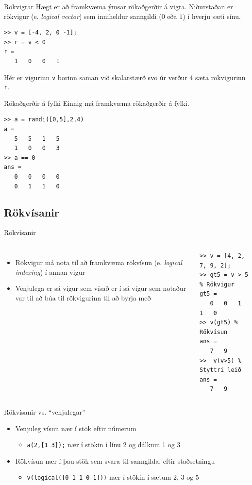 \documentclass{beamer}
\begin{document}
\begin{frame}[fragile]{Rökvigrar}
\vspace{\baselineskip}
Hægt er að framkvæma ýmsar rökaðgerðir á vigra. Niðurstaðan er rökvigur (e. \emph{logical vector}) sem inniheldur sanngildi ($0$ eða $1$) í hverju sæti sínu.
\begin{verbatim}
>> v = [-4, 2, 0 -1];
>> r = v < 0
r =
   1   0   0   1
\end{verbatim}
Hér er vigurinn \texttt{v} borinn saman við skalarstærð svo úr verður 4 sæta rökvigurinn \texttt{r}.
\end{frame}

\begin{frame}[fragile]{Rökaðgerðir á fylki}
\vspace{\baselineskip}
Einnig má framkvæma rökaðgerðir á fylki.
\begin{verbatim}
>> a = randi([0,5],2,4)
a =
   5   5   1   5
   1   0   0   3
>> a == 0
ans =
   0   0   0   0
   0   1   1   0
\end{verbatim}
\end{frame}

\subsection{Rökvísanir}
\begin{frame}[fragile]{Rökvísanir}
\begin{columns}
\begin{itemize}
 \item Rökvigur má nota til að framkvæma rökvísun (e. \emph{logical indexing}) í annan vigur
 \item Venjulega er sá vigur sem vísað er í sá vigur sem notaður var til að búa til rökvigurinn til að byrja með
\end{itemize}
\begin{verbatim}
>> v = [4, 2, 7, 9, 2];
>> gt5 = v > 5 % Rökvigur
gt5 =
   0   0   1   1   0
>> v(gt5) % Rökvísun
ans =
   7   9
>>  v(v>5) % Styttri leið
ans =
   7   9
\end{verbatim}
\end{columns}
\end{frame}

\begin{frame}{Rökvísanir vs. ``venjulegar''}
\begin{itemize}
 \item Venjuleg vísun nær í stök eftir númerum
 \begin{itemize}
  \item \texttt{a(2,[1 3]);} nær í stökin í línu 2 og dálkum 1 og 3
 \end{itemize}
 \item Rökvísun nær í þau stök sem svara til sanngilda, eftir staðsetningu
 \begin{itemize}
  \item \texttt{v(logical([0 1 1 0 1]))} nær í stökin í sætum 2, 3 og 5
 \end{itemize}
\end{itemize}
\end{frame}
\end{document}

